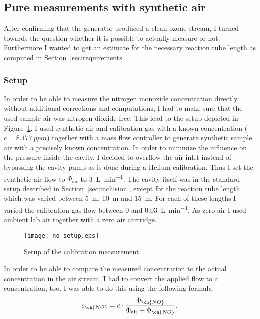 \subsection{Pure  measurements with synthetic air}
\label{sec:no}

After confirming that the generator produced a clean ozone stream, I
turned towards the question whether it is possible to actually measure
 or not. Furthermore I wanted to get an estimate for the
necessary reaction tube length as computed in
Section~\ref{sec:requirements}.

\subsubsection{Setup}
\label{sec:no-setup}

In order to be able to measure the nitrogen monoxide concentration
directly without additional corrections and computations, I had to
make sure that the used sample air was nitrogen dioxide free. This
lead to the setup depicted in Figure~\ref{fig:no-setup}. I used
synthetic air and  calibration gas with a known 
concentration ($c = \SI{8.177}{ppm}$) together with a mass flow
controller to generate synthetic sample air with a precisely known
 concentration. In order to minimize the influence on the
pressure inside the cavity, I decided to overflow the air inlet
instead of bypassing the cavity pump as is done during a Helium
calibration. Thus I set the synthetic air flow to $\Phi_{\text{air}}$
to \SI{3}{\liter\per\minute}. The cavity itself was in the standard
setup described in Section~\ref{sec:inclusion}, except for the
reaction tube length which was varied between \SI{5}{\meter},
\SI{10}{\meter} and \SI{15}{\meter}. For each of these lengths I
varied the  calibration gas flow between \num{0} and
\SI{0.03}{\liter\per\minute}. As zero air I used ambient lab air
together with a zero air cartridge.

\begin{figure}[htbp]
  \centering
  \texttt{[image: no\_setup.eps]}
  \caption{Setup of the calibration measurement}
  \label{fig:no-setup}
\end{figure}

In order to be able to compare the measured  concentration to the
actual concentration in the air stream, I had to convert the applied
 flow to a concentration, too. I was able to do this using the
following formula
\begin{align}
  c_{\ch{NO}} = c \cdot \frac{\Phi_{\ch{NO}}}{\Phi_{\text{air}} +
  \Phi_{\ch{NO}}}. \label{eq:c-flow}
\end{align}

